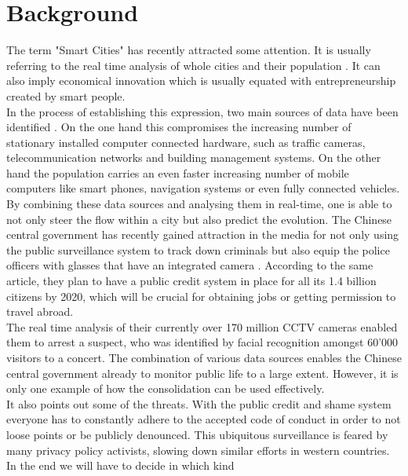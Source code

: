 \documentclass[letterpaper]{article}
\begin{document}
\section{Background}\label{sec:background}
The term "Smart Cities" has recently attracted \cite{Ferdowsi2018,Abu-Matar2018,Usman2018} some attention. It is usually referring
to the real time analysis of whole cities and their population \cite{smartCities3}. It can also imply economical
innovation which is usually equated with entrepreneurship created by smart people.\\
\indent In the process of establishing this expression, two main  sources of data have been identified \cite{smartCities3}.
On the one hand this compromises the increasing number of stationary installed computer connected hardware, such as traffic cameras,
telecommunication networks and building management systems. On the other hand the population carries an even faster increasing
number of mobile computers like smart phones, navigation systems or even fully connected vehicles.\\
\indent By combining these data sources and analysing them in real-time, one is able to not only steer the flow within a city
but also predict the evolution. The Chinese central government has recently gained attraction in the media \cite{thediplomat1} for not only
using the public surveillance system to track down criminals but also equip the police officers with glasses that have an integrated
camera \cite{cnet1}. According to the same article, they plan to have a public credit system in place for all its 1.4 billion citizens
by 2020, which will be crucial for obtaining jobs or getting permission to travel abroad.\\
\indent The real time analysis of their currently over 170 million CCTV cameras \cite{bbc1} enabled them to arrest a suspect, who was identified by facial recognition amongst 60'000 visitors to a concert. The combination of various data sources enables the Chinese central government already to monitor public life to a large extent. However, it is only one example of how the consolidation can be used effectively.\\
\indent It also points out some of the threats. With the public credit and shame system \cite{cnet1} everyone has to constantly
adhere to the accepted code of conduct in order to not loose points or be publicly denounced. This ubiquitous surveillance is feared
by many privacy policy activists, slowing down similar efforts in western countries. In the end we will have to decide in which kind
\end{document}
